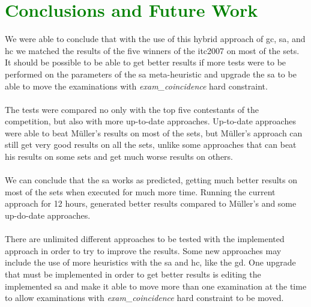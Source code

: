 \chapter{\textcolor{green}{Conclusions and Future Work}}
\label{chap:FutureWork}

We were able to conclude that with the use of this hybrid approach of \gls{gc}, \gls{sa}, and \gls{hc} we matched the results of the five winners of the \gls{itc2007} on most of the sets. It should be possible to be able to get better results if more tests were to be performed on the parameters of the \gls{sa} meta-heuristic and upgrade the \gls{sa} to be able to move the examinations with \textit{exam\_coincidence} hard constraint.\\
\\
The tests were compared no only with the top five contestants of the competition, but also with more up-to-date approaches. Up-to-date approaches were able to beat M\"{u}ller's results on most of the sets, but M\"{u}ller's approach can still get very good results on all the sets, unlike some approaches that can beat his results on some sets and get much worse results on others.\\
\\
We can conclude that the \gls{sa} works as predicted, getting much better results on most of the sets when executed for much more time. Running the current approach for 12 hours, generated better results compared to M\"{u}ller's and some up-do-date approaches.\\
\\
There are unlimited different approaches to be tested with the implemented approach in order to try to improve the results. Some new approaches may include the use of more heuristics with the \gls{sa} and \gls{hc}, like the \gls{gd}. One upgrade that must be implemented in order to get better results is editing the implemented \gls{sa} and make it able to move more than one examination at the time to allow examinations with \textit{exam\_coincidence} hard constraint to be moved.